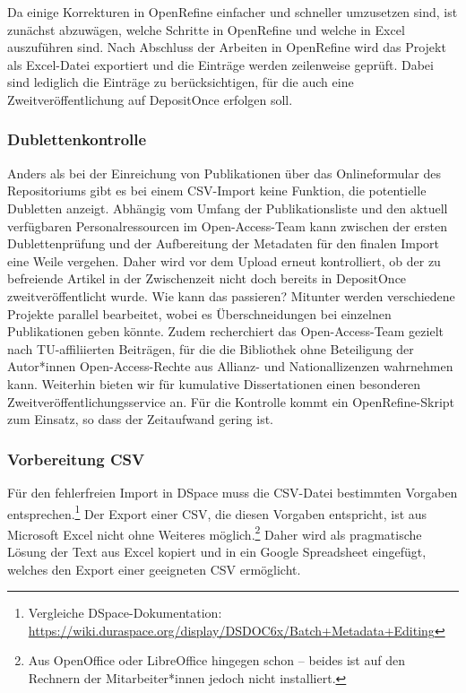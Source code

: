 \documentclass[a4paper,
fontsize=11pt,
oneside,
numbers=noperiodatend,
parskip=half-,
bibliography=totoc,
final
]{scrartcl}
\begin{document}
Da einige Korrekturen in OpenRefine einfacher und schneller umzusetzen
sind, ist zunächst abzuwägen, welche Schritte in OpenRefine und welche
in Excel auszuführen sind. Nach Abschluss der Arbeiten in OpenRefine
wird das Projekt als Excel-Datei exportiert und die Einträge werden
zeilenweise geprüft. Dabei sind lediglich die Einträge zu
berücksichtigen, für die auch eine Zweitveröffentlichung auf DepositOnce
erfolgen soll.

\hypertarget{dublettenkontrolle}{%
\subsubsection{Dublettenkontrolle}\label{dublettenkontrolle}}

Anders als bei der Einreichung von Publikationen über das Onlineformular
des Repositoriums gibt es bei einem CSV-Import keine Funktion, die
potentielle Dubletten anzeigt. Abhängig vom Umfang der Publikationsliste
und den aktuell verfügbaren Personalressourcen im Open-Access-Team kann
zwischen der ersten Dublettenprüfung und der Aufbereitung der Metadaten
für den finalen Import eine Weile vergehen. Daher wird vor dem Upload
erneut kontrolliert, ob der zu befreiende Artikel in der Zwischenzeit
nicht doch bereits in DepositOnce zweitveröffentlicht wurde. Wie kann
das passieren? Mitunter werden verschiedene Projekte parallel
bearbeitet, wobei es Überschneidungen bei einzelnen Publikationen geben
könnte. Zudem recherchiert das Open-Access-Team gezielt nach
TU-affiliierten Beiträgen, für die die Bibliothek ohne Beteiligung der
Autor*innen Open-Access-Rechte aus Allianz- und Nationallizenzen
wahrnehmen kann. Weiterhin bieten wir für kumulative Dissertationen
einen besonderen Zweitveröffentlichungsservice an. Für die Kontrolle
kommt ein OpenRefine-Skript zum Einsatz, so dass der Zeitaufwand gering
ist.

\hypertarget{vorbereitung-csv}{%
\subsubsection{Vorbereitung CSV}\label{vorbereitung-csv}}

Für den fehlerfreien Import in DSpace muss die CSV-Datei bestimmten
Vorgaben entsprechen.\footnote{Vergleiche DSpace-Dokumentation:
  \url{https://wiki.duraspace.org/display/DSDOC6x/Batch+Metadata+Editing}}
Der Export einer CSV, die diesen Vorgaben entspricht, ist aus Microsoft
Excel nicht ohne Weiteres möglich.\footnote{Aus OpenOffice oder
  LibreOffice hingegen schon -- beides ist auf den Rechnern der
  Mitarbeiter*innen jedoch nicht installiert.} Daher wird als
pragmatische Lösung der Text aus Excel kopiert und in ein Google
Spreadsheet eingefügt, welches den Export einer geeigneten CSV
ermöglicht.
\end{document}
